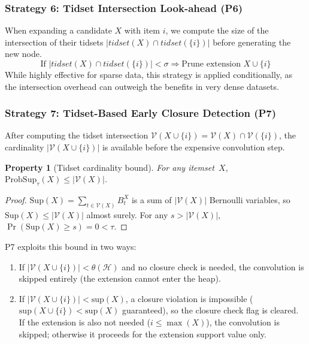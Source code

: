 \documentclass[10pt,letterpaper]{article}
\newtheorem{property}{Property}
\begin{document}
\subsubsection*{Strategy 6: Tidset Intersection Look-ahead (P6)}
When expanding a candidate $X$ with item $i$, we compute the size of the intersection of their tidsets $|\mathit{tidset}(X) \cap \mathit{tidset}(\{i\})|$ before generating the new node.
\begin{equation}
\text{If } |\mathit{tidset}(X) \cap \mathit{tidset}(\{i\})| < \sigma \Rightarrow \text{Prune extension } X \cup \{i\}
\end{equation}
While highly effective for sparse data, this strategy is applied conditionally, as the intersection overhead can outweigh the benefits in very dense datasets.

\subsubsection*{Strategy 7: Tidset-Based Early Closure Detection (P7)}

After computing the tidset intersection
$\mathcal{V}(X \cup \{i\}) = \mathcal{V}(X) \cap \mathcal{V}(\{i\})$, the
cardinality $|\mathcal{V}(X \cup \{i\})|$ is available before the expensive
convolution step.

\begin{property}[Tidset cardinality bound]
\label{prop:tidset_bound}
For any itemset~$X$, $\mathrm{ProbSup}_{\tau}(X) \le |\mathcal{V}(X)|$.
\end{property}

\begin{proof}
$\mathrm{Sup}(X) = \sum_{t \in \mathcal{V}(X)} B_t^X$ is a sum of
$|\mathcal{V}(X)|$ Bernoulli variables, so $\mathrm{Sup}(X) \le |\mathcal{V}(X)|$
almost surely. For any $s > |\mathcal{V}(X)|$, $\Pr(\mathrm{Sup}(X) \ge s) = 0 < \tau$.
\end{proof}

P7 exploits this bound in two ways:
\begin{enumerate}
    \item If $|\mathcal{V}(X \cup \{i\})| < \theta(\mathcal{H})$ and no closure
    check is needed, the convolution is skipped entirely (the extension cannot
    enter the heap).
    \item If $|\mathcal{V}(X \cup \{i\})| < \mathrm{sup}(X)$, a closure violation
    is impossible ($\mathrm{sup}(X \cup \{i\}) < \mathrm{sup}(X)$ guaranteed), so
    the closure check flag is cleared. If the extension is also not needed
    ($i \le \max(X)$), the convolution is skipped; otherwise it proceeds for the
    extension support value only.
\end{enumerate}
\end{document}
